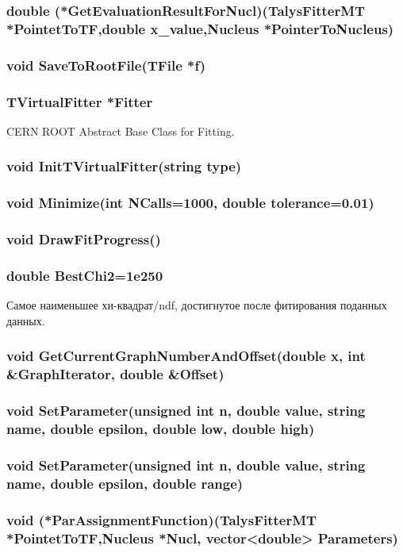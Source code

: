 \documentclass[a4paper,12pt]{extarticle}
\begin{document}
\subsubsection{double (*GetEvaluationResultForNucl)(TalysFitterMT *PointetToTF,double x_value,Nucleus *PointerToNucleus)}
\subsubsection{void SaveToRootFile(TFile *f)}
\subsubsection{TVirtualFitter *Fitter}
CERN ROOT Abstract Base Class for Fitting.
\subsubsection{void InitTVirtualFitter(string type)}
\subsubsection{void Minimize(int NCalls=1000, double tolerance=0.01)}
\subsubsection{void DrawFitProgress()}
\subsubsection{double BestChi2=1e250}
Самое наименьшее хи-квадрат/ndf, достигнутое после фитирования поданных данных.
\subsubsection{void GetCurrentGraphNumberAndOffset(double x, int \textbf{\&}GraphIterator, double \textbf{\&}Offset)}
\subsubsection{void SetParameter(unsigned int n, double value, string name, double epsilon, double low, double high)}
\subsubsection{void SetParameter(unsigned int n, double value, string name, double epsilon, double range)}
\subsubsection{void (*ParAssignmentFunction)(TalysFitterMT *PointetToTF,Nucleus *Nucl, vector<double> Parameters)}
\end{document}
